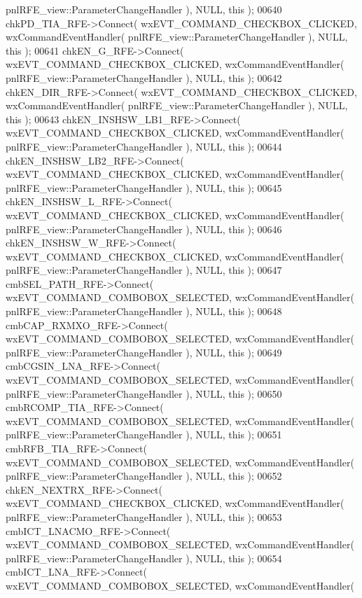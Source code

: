 \begin{DoxyCode}
      pnlRFE_view::ParameterChangeHandler ), NULL, \textcolor{keyword}{this} );
00640     chkPD_TIA_RFE->Connect( wxEVT\_COMMAND\_CHECKBOX\_CLICKED, wxCommandEventHandler( 
      pnlRFE_view::ParameterChangeHandler ), NULL, \textcolor{keyword}{this} );
00641     chkEN_G_RFE->Connect( wxEVT\_COMMAND\_CHECKBOX\_CLICKED, wxCommandEventHandler( 
      pnlRFE_view::ParameterChangeHandler ), NULL, \textcolor{keyword}{this} );
00642     chkEN_DIR_RFE->Connect( wxEVT\_COMMAND\_CHECKBOX\_CLICKED, wxCommandEventHandler( 
      pnlRFE_view::ParameterChangeHandler ), NULL, \textcolor{keyword}{this} );
00643     chkEN_INSHSW_LB1_RFE->Connect( wxEVT\_COMMAND\_CHECKBOX\_CLICKED, wxCommandEventHandler( 
      pnlRFE_view::ParameterChangeHandler ), NULL, \textcolor{keyword}{this} );
00644     chkEN_INSHSW_LB2_RFE->Connect( wxEVT\_COMMAND\_CHECKBOX\_CLICKED, wxCommandEventHandler( 
      pnlRFE_view::ParameterChangeHandler ), NULL, \textcolor{keyword}{this} );
00645     chkEN_INSHSW_L_RFE->Connect( wxEVT\_COMMAND\_CHECKBOX\_CLICKED, wxCommandEventHandler( 
      pnlRFE_view::ParameterChangeHandler ), NULL, \textcolor{keyword}{this} );
00646     chkEN_INSHSW_W_RFE->Connect( wxEVT\_COMMAND\_CHECKBOX\_CLICKED, wxCommandEventHandler( 
      pnlRFE_view::ParameterChangeHandler ), NULL, \textcolor{keyword}{this} );
00647     cmbSEL_PATH_RFE->Connect( wxEVT\_COMMAND\_COMBOBOX\_SELECTED, wxCommandEventHandler( 
      pnlRFE_view::ParameterChangeHandler ), NULL, \textcolor{keyword}{this} );
00648     cmbCAP_RXMXO_RFE->Connect( wxEVT\_COMMAND\_COMBOBOX\_SELECTED, wxCommandEventHandler( 
      pnlRFE_view::ParameterChangeHandler ), NULL, \textcolor{keyword}{this} );
00649     cmbCGSIN_LNA_RFE->Connect( wxEVT\_COMMAND\_COMBOBOX\_SELECTED, wxCommandEventHandler( 
      pnlRFE_view::ParameterChangeHandler ), NULL, \textcolor{keyword}{this} );
00650     cmbRCOMP_TIA_RFE->Connect( wxEVT\_COMMAND\_COMBOBOX\_SELECTED, wxCommandEventHandler( 
      pnlRFE_view::ParameterChangeHandler ), NULL, \textcolor{keyword}{this} );
00651     cmbRFB_TIA_RFE->Connect( wxEVT\_COMMAND\_COMBOBOX\_SELECTED, wxCommandEventHandler( 
      pnlRFE_view::ParameterChangeHandler ), NULL, \textcolor{keyword}{this} );
00652     chkEN_NEXTRX_RFE->Connect( wxEVT\_COMMAND\_CHECKBOX\_CLICKED, wxCommandEventHandler( 
      pnlRFE_view::ParameterChangeHandler ), NULL, \textcolor{keyword}{this} );
00653     cmbICT_LNACMO_RFE->Connect( wxEVT\_COMMAND\_COMBOBOX\_SELECTED, wxCommandEventHandler( 
      pnlRFE_view::ParameterChangeHandler ), NULL, \textcolor{keyword}{this} );
00654     cmbICT_LNA_RFE->Connect( wxEVT\_COMMAND\_COMBOBOX\_SELECTED, wxCommandEventHandler( 

\end{DoxyCode}
